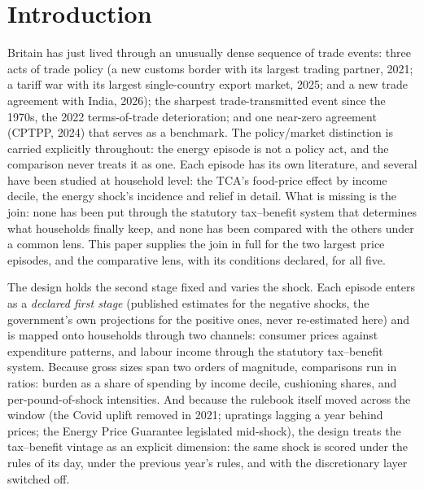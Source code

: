 \section{Introduction}\label{sec:intro}

Britain has just lived through an unusually dense sequence of trade
events: three acts of trade policy (a new customs
border with its largest trading partner, 2021; a tariff war with its
largest single-country export market, 2025; and a new trade agreement
with India, 2026); the sharpest trade-transmitted event since the
1970s, the 2022 terms-of-trade deterioration; and one near-zero
agreement (CPTPP, 2024) that serves as a benchmark. The
policy/market distinction is carried explicitly throughout: the energy
episode is not a policy act, and the comparison never treats it as
one. Each episode has its own literature, and several have been studied at
household level: the TCA's food-price effect by income decile, the
energy shock's incidence and relief in detail. What is missing is the
join: none has been put through the statutory tax--benefit system that
determines what households finally keep, and none has been compared
with the others under a common lens. This paper supplies the join in
full for the two largest price episodes, and the comparative lens,
with its conditions declared, for all five.

The design holds the second stage fixed and varies the shock. Each
episode enters as a \emph{declared first stage} (published estimates
for the negative shocks, the government's own projections for the
positive ones, never re-estimated here) and is mapped onto households
through two channels: consumer prices against expenditure patterns,
and labour income through the statutory tax--benefit system. Because
gross sizes span two orders of magnitude, comparisons run in ratios:
burden as a share of spending by income decile, cushioning shares, and
per-pound-of-shock intensities. And because the rulebook itself moved
across the window (the Covid uplift removed in 2021; upratings lagging
a year behind prices; the Energy Price Guarantee legislated
mid-shock), the design treats the tax--benefit vintage as an explicit
dimension: the same shock is scored under the rules of its day, under
the previous year's rules, and with the discretionary layer switched
off.

